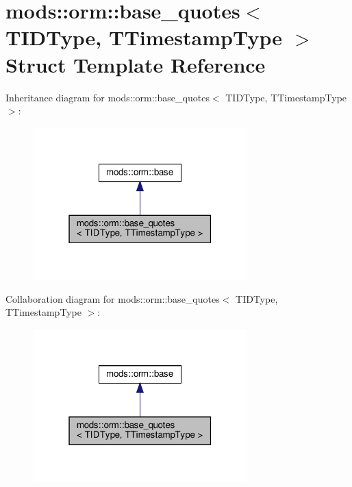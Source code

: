 \hypertarget{structmods_1_1orm_1_1base__quotes}{}\section{mods\+:\+:orm\+:\+:base\+\_\+quotes$<$ T\+I\+D\+Type, T\+Timestamp\+Type $>$ Struct Template Reference}
\label{structmods_1_1orm_1_1base__quotes}


Inheritance diagram for mods\+:\+:orm\+:\+:base\+\_\+quotes$<$ T\+I\+D\+Type, T\+Timestamp\+Type $>$\+:
\nopagebreak
\begin{figure}[H]
\begin{center}
\leavevmode
\includegraphics[width=235pt]{structmods_1_1orm_1_1base__quotes__inherit__graph}
\end{center}
\end{figure}


Collaboration diagram for mods\+:\+:orm\+:\+:base\+\_\+quotes$<$ T\+I\+D\+Type, T\+Timestamp\+Type $>$\+:
\nopagebreak
\begin{figure}[H]
\begin{center}
\leavevmode
\includegraphics[width=235pt]{structmods_1_1orm_1_1base__quotes__coll__graph}
\end{center}
\end{figure}
